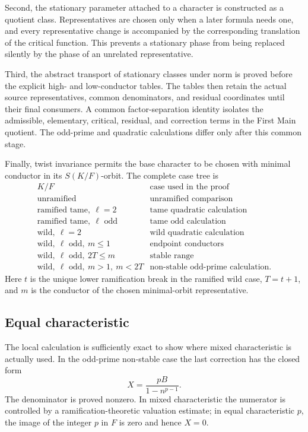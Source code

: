 \documentclass[11pt]{amsart}
\theoremstyle{definition}
\theoremstyle{remark}
\begin{document}
Second, the stationary parameter attached to a character is constructed
as a quotient class.  Representatives are chosen only when a later
formula needs one, and every representative change is accompanied by
the corresponding translation of the critical function.  This prevents
a stationary phase from being replaced silently by the phase of an
unrelated representative.

Third, the abstract transport of stationary classes under norm is
proved before the explicit high- and low-conductor tables.  The tables
then retain the actual source representatives, common denominators, and
residual coordinates until their final consumers.  A common
factor-separation identity isolates the admissible, elementary,
critical, residual, and correction terms in the First Main quotient.
The odd-prime and quadratic calculations differ only after this common
stage.

Finally, twist invariance permits the base character to be chosen with
minimal conductor in its $S(K/F)$-orbit.  The complete case tree is
\[
\begin{array}{c|l}
K/F & \text{case used in the proof}\\ \hline
\text{unramified} & \text{unramified comparison}\\
\text{ramified tame},\ \ell=2 & \text{tame quadratic calculation}\\
\text{ramified tame},\ \ell\text{ odd} & \text{tame odd calculation}\\
\text{wild},\ \ell=2 & \text{wild quadratic calculation}\\
\text{wild},\ \ell\text{ odd},\ m\le1
  & \text{endpoint conductors}\\
\text{wild},\ \ell\text{ odd},\ 2T\le m
  & \text{stable range}\\
\text{wild},\ \ell\text{ odd},\ m>1,\ m<2T
  & \text{non-stable odd-prime calculation}.
\end{array}
\]
Here $t$ is the unique lower ramification break in the ramified wild
case, $T=t+1$, and $m$ is the conductor of the chosen minimal-orbit
representative.   

\subsection*{Equal characteristic}
The local calculation is sufficiently exact to show where mixed
characteristic is actually used.  In the odd-prime non-stable case the
last correction has the closed form
\[
 X=\frac{pB}{1-n^{p-1}}.
\]
The denominator is proved nonzero.  In mixed characteristic the
numerator is controlled by a ramification-theoretic valuation estimate;
in equal characteristic $p$, the image of the integer $p$ in $F$ is
zero and hence $X=0$.
\end{document}
